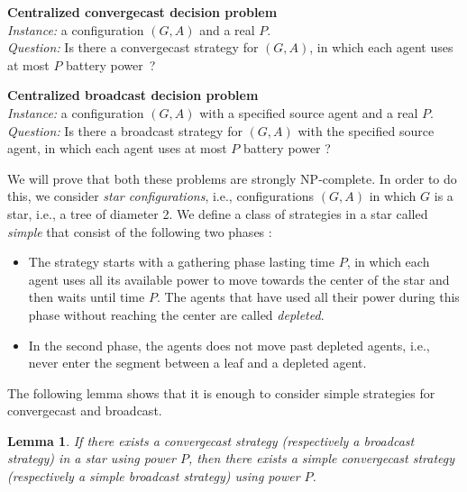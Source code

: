 \documentclass{article}
\newtheorem{lemma}{Lemma}
\newcommand{\probleme}[3]{\medskip\noindent\textbf{#1 problem}\\ \noindent \emph{Instance: }#2\\ \noindent \emph{Question: }#3\medskip}
\newcommand\strat{\mbox{strategy}\xspace}
\newcommand\convergecast{convergecast\xspace}
\newcommand\broadcast{broadcast\xspace}
\newcommand\ccast{convergecast\xspace}
\begin{document}
\probleme{Centralized {\convergecast} decision}{a configuration $(G,A)$ and a real $P$.}{Is there a convergecast {\strat} for $(G,A)$, in which each agent uses at most $P$ battery power~?}

\probleme{Centralized {\broadcast} decision}{a configuration $(G,A)$ with a specified source agent and a real $P$.}{Is there a broadcast {\strat} for $(G,A)$ with the specified source agent, in which each agent uses at most $P$ battery power ?}

We will prove that both these problems are strongly NP-complete.
In order to do this, we consider \emph{star configurations}, i.e., configurations $(G,A)$ in which $G$ is a star, i.e., a tree of diameter 2. We define a class of strategies in a star 
called \emph{simple} that consist of the following two phases :

\begin{itemize}
\item The strategy starts with a gathering phase lasting time $P$,
in which each agent uses all its available power to move towards the center of the star and then waits until time $P$. The agents that have used all their power during this phase without reaching the center are called \emph{depleted}.
\item In the second phase, the agents does not move past depleted agents, i.e., never enter the segment between a leaf and a depleted agent.
\end{itemize}
The following lemma shows that it is enough to consider simple strategies for convergecast and broadcast.

\begin{lemma}\label{cl:simpl}
If there exists a {\ccast} {\strat} (respectively a broadcast strategy) in a star using power $P$, then there exists a simple {\ccast} {\strat} (respectively a simple broadcast strategy) using power $P$.
\end{lemma}
\end{document}
